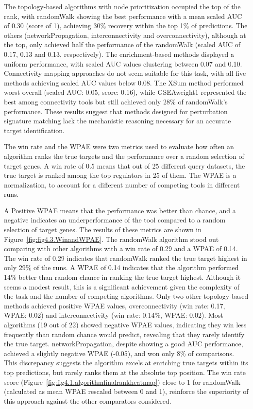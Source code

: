 The topology-based algorithms with node prioritization occupied the top of the rank, with randomWalk showing the best performance with a mean scaled \gls{AUC} of 0.30 (score of 1), achieving 30\% recovery within the top 1\% of predictions.
The others (networkPropagation, interconnectivity and overconnectivity), although at the top, only achieved half the performance of the randomWalk (scaled \gls{AUC} of 0.17, 0.13 and 0.13, respectively).
The enrichment-based methods displayed a uniform performance, with scaled \gls{AUC} values clustering between 0.07 and 0.10.
Connectivity mapping approaches do not seem suitable for this task, with all five methods achieving scaled \gls{AUC} values below 0.08.
The XSum method performed worst overall (scaled \gls{AUC}: 0.05, score: 0.16), while GSEAweight1 represented the best among connectivity tools but still achieved only 28\% of randomWalk's performance.
These results suggest that methods designed for perturbation signature matching lack the mechanistic reasoning necessary for an accurate target identification.

The win rate and the \gls{WPAE} were two metrics used to evaluate how often an algorithm ranks the true targets and the performance over a random selection of target genes.
A win rate of 0.5 means that out of 25 different query datasets, the true target is ranked among the top regulators in 25 of them.
The \gls{WPAE} is a normalization, to account for a different number of competing tools in different runs.

A Positive \gls{WPAE} means that the performance was better than chance, and a negative indicates an underperformance of the tool compared to a random selection of target genes.
The results of these metrics are shown in Figure~\ref{fig:fig4.3.WinandWPAE}.
The randomWalk algorithm stood out comparing with other algorithms with a win rate of 0.29 and a \gls{WPAE} of 0.14.
The win rate of 0.29 indicates that randomWalk ranked the true target highest in only 29\% of the runs.
A \gls{WPAE} of 0.14 indicates that the algorithm performed 14\% better than random chance in ranking the true target highest.
Although it seems a modest result, this is a significant achievement given the complexity of the task and the number of competing algorithms.
Only two other topology-based methods achieved positive WPAE values, overconnectivity (win rate: 0.17, WPAE: 0.02) and interconnectivity (win rate: 0.14\%, \gls{WPAE}: 0.02).
Most algorithms (19 out of 22) showed negative \gls{WPAE} values, indicating they win less frequently than random chance would predict, revealing that they rarely identify the true target.
networkPropagation, despite showing a good \gls{AUC} performance, achieved a slightly negative \gls{WPAE} (-0.05), and won only 8\% of comparisons.
This discrepancy suggests the algorithm excels at enriching true targets within its top predictions, but rarely ranks them at the absolute top position.
The win rate score (Figure~\ref{fig:fig4.1.algorithmfinalrankheatmap}) close to 1 for randomWalk (calculated as mean \gls{WPAE} rescaled between 0 and 1), reinforce the superiority of this approach against the other comparators considered.


